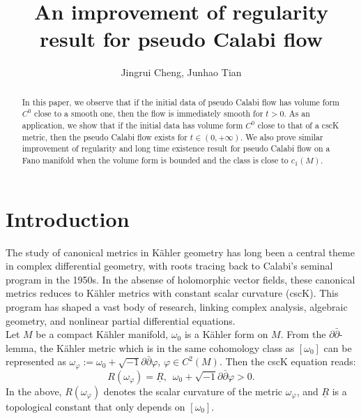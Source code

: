 \documentclass[11pt]{amsart}
\title{An improvement of regularity result for pseudo Calabi flow}
\author{Jingrui Cheng,  Junhao Tian}
\numberwithin{equation}{section}
\begin{document}
\maketitle

\begin{abstract}
In this paper,  we observe that if the initial data of pseudo Calabi flow has volume form $C^0$ close to a smooth one,  then the flow is immediately smooth for $t>0$.  As an application,  we show that if the initial data has volume form $C^0$ close to that of a cscK metric,  then the pseudo Calabi flow exists for $t\in (0,+\infty)$.  We also prove similar improvement of regularity and long time existence result for pseudo Calabi flow on a Fano manifold when the volume form is bounded and the class is close to $c_1(M)$.  
\end{abstract}

\section{Introduction}

The study of canonical metrics in K\"ahler geometry has long been a central theme in complex differential geometry, with roots tracing back to Calabi's seminal program in the 1950s.  In the absense of holomorphic vector fields,  these canonical metrics reduces to K\"ahler metrics with constant scalar curvature (cscK). This program has shaped a vast body of research, linking complex analysis, algebraic geometry, and nonlinear partial differential equations. \\

Let $M$ be a compact K\"ahler manifold,  $\omega_0$ is a K\"ahler form on $M$.  From the $\partial\bar{\partial}$-lemma,  the K\"ahler metric which is in the same cohomology class as $[\omega_0]$ can be represented as $\omega_{\varphi}:=\omega_0+\sqrt{-1}\partial\bar{\partial}\varphi,\,\varphi\in C^2(M)$.  Then the cscK equation reads:
\begin{equation}\label{cscK}
R(\omega_{\varphi})=\underline{R},\,\,\,\omega_0+\sqrt{-1}\partial\bar{\partial}\varphi>0.
\end{equation}
In the above,  $R(\omega_{\varphi})$ denotes the scalar curvature of the metric $\omega_{\varphi}$,  and $\underline{R}$ is a topological constant that only depends on $[\omega_0]$.\\
\end{document}
